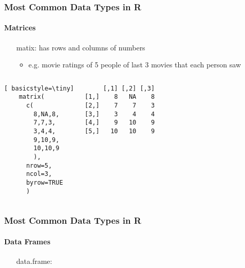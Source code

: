 \begin{frame}[fragile]
	\frametitle{Most Common Data Types in R}
	\framesubtitle{Matrices}

	\begin{itemize}
		\item[matix:] has rows and columns of numbers
			\begin{itemize}
				\item e.g. movie ratings of 5 people of last 3 movies that each person saw 
			\end{itemize}
		\end{itemize}

   \begin{columns}
     	\begin{center}
		\begin{lstlisting}[ basicstyle=\tiny]
	matrix(
	  c(
	    8,NA,8,
	    7,7,3,
		3,4,4,
		9,10,9,
		10,10,9
		),
	  nrow=5,
	  ncol=3,
	  byrow=TRUE
	  )
		\end{lstlisting}
     	\end{center}
      \begin{center}
{ \small
				\begin{verbatim} 
     [,1] [,2] [,3]
[1,]    8   NA    8
[2,]    7    7    3
[3,]    3    4    4
[4,]    9   10    9
[5,]   10   10    9
			\end{verbatim} \normalsize
}
       \end{center}
     \end{columns}
\end{frame}

\begin{frame}[fragile]
	\frametitle{Most Common Data Types in R}
	\framesubtitle{Data Frames}

	\begin{itemize}
		\item[data.frame:]
	\end{itemize}

\end{frame}







